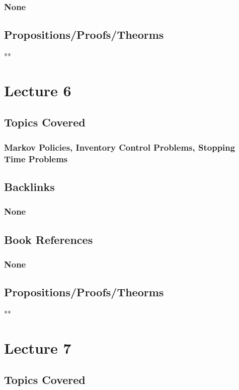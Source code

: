 \documentclass[11pt]{article}
\begin{document}
\subsubsection*{None}
\label{sec:org8bbc375}
\subsection*{Propositions/Proofs/Theorms}
\label{sec:org2b04b72}
**

\section*{Lecture 6}
\label{sec:org70d7edd}
\subsection*{Topics Covered}
\label{sec:org35c68ce}
\subsubsection*{Markov Policies, Inventory Control Problems, Stopping Time Problems}
\label{sec:orgf141bf4}
\subsection*{Backlinks}
\label{sec:orga1cc816}
\subsubsection*{None}
\label{sec:orga6b5c4a}
\subsection*{Book References}
\label{sec:orgca40e27}
\subsubsection*{None}
\label{sec:orgcf86e61}
\subsection*{Propositions/Proofs/Theorms}
\label{sec:orgca0b38a}
**

\section*{Lecture 7}
\label{sec:orgdcfff4d}
\subsection*{Topics Covered}
\label{sec:orgd5d7a75}
\end{document}
